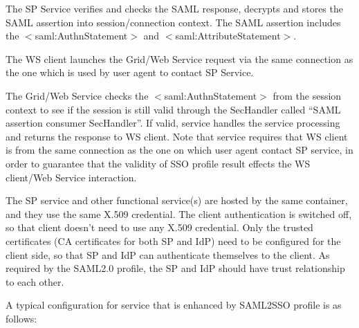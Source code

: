 \documentclass{article}                            %
\begin{document}
\begin{list}{.}
    \item The SP Service verifies and checks the SAML response, decrypts and stores the SAML assertion into session/connection context. The SAML assertion includes the $<$saml:AuthnStatement$>$ and $<$saml:AttributeStatement$>$.

    \item The WS client launches the Grid/Web Service request via the same connection as the one which is used by user agent to contact SP Service.

    \item The Grid/Web Service checks the $<$saml:AuthnStatement$>$ from the session context to see if the session is still valid through the SecHandler called ``SAML assertion consumer SecHandler''. If valid, service handles the service processing and returns the response to WS client. Note that service requires that WS client is from the same connection as the one on which user agent contact SP service, in order to guarantee that the validity of SSO profile result effects the WS client/Web Service interaction.

    The SP service and other functional service(s) are hosted by the same container, and they use the same X.509 credential. The client authentication is switched off, so that client doesn’t need to use any X.509 credential. Only the trusted certificates (CA certificates for both SP and IdP) need to be configured for the client side, so that SP and IdP can authenticate themselves to the client. As required by the SAML2.0 profile, the SP and IdP should have trust relationship to each other.
   \end{list}

    A typical configuration for service that is enhanced by SAML2SSO profile is as follows:
\end{document}

